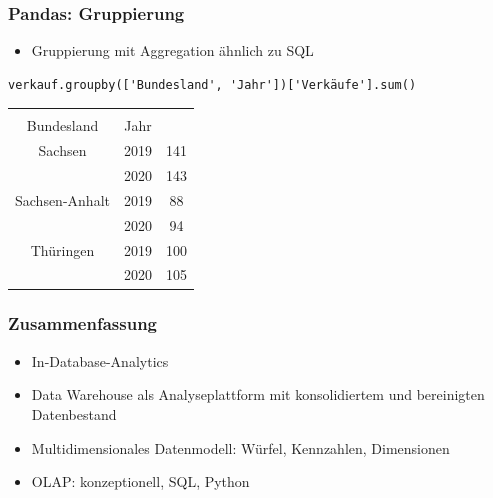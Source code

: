 \begin{frame}[fragile]
  \frametitle{Pandas: Gruppierung}

  \begin{itemize}
\item Gruppierung mit Aggregation ähnlich zu SQL
  \end{itemize}

\begin{verbatim}
verkauf.groupby(['Bundesland', 'Jahr'])['Verkäufe'].sum()
\end{verbatim}

{\small
\begin{center}
  \begin{tabular}{|c|c||c|}
  \hline
  \rowcolor{Gray}  & &  \\
  \rowcolor{Gray} Bundesland & Jahr & \\
  \hline \hline
Sachsen        & 2019 & 141 \\
               & 2020 & 143 \\
Sachsen-Anhalt &  2019 & 88 \\
               & 2020 & 94 \\
Thüringen      &  2019 & 100 \\
               & 2020 & 105 \\
\hline 
  \end{tabular}
\end{center}
}
\end{frame}

\begin{frame}
        \frametitle{Zusammenfassung}
        
        \begin{itemize}
            \item In-Database-Analytics 
            \item Data Warehouse als Analyseplattform mit konsolidiertem und bereinigten Datenbestand
            \item Multidimensionales Datenmodell: Würfel, Kennzahlen, Dimensionen
            \item OLAP: konzeptionell, SQL, Python
        \end{itemize}
\end{frame}